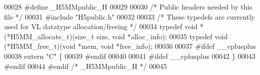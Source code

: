 \begin{DoxyCode}
00028 \textcolor{preprocessor}{#define \_H5MMpublic\_H}
00029 
00030 \textcolor{comment}{/* Public headers needed by this file */}
00031 \textcolor{preprocessor}{#include "H5public.h"}
00032 
00033 \textcolor{comment}{/* These typedefs are currently used for VL datatype allocation/freeing */}
00034 \textcolor{keyword}{typedef} \textcolor{keywordtype}{void} *(*H5MM\_allocate\_t)(\textcolor{keywordtype}{size\_t} size, \textcolor{keywordtype}{void} *alloc\_info);
00035 \textcolor{keyword}{typedef} void (*H5MM\_free\_t)(\textcolor{keywordtype}{void} *mem, \textcolor{keywordtype}{void} *free\_info);
00036 
00037 \textcolor{preprocessor}{#ifdef \_\_cplusplus}
00038 \textcolor{keyword}{extern} \textcolor{stringliteral}{"C"} \{
00039 \textcolor{preprocessor}{#endif}
00040 
00041 \textcolor{preprocessor}{#ifdef \_\_cplusplus}
00042 \}
00043 \textcolor{preprocessor}{#endif}
00044 \textcolor{preprocessor}{#endif }\textcolor{comment}{/* \_H5MMpublic\_H */}\textcolor{preprocessor}{}
00045 
\end{DoxyCode}
